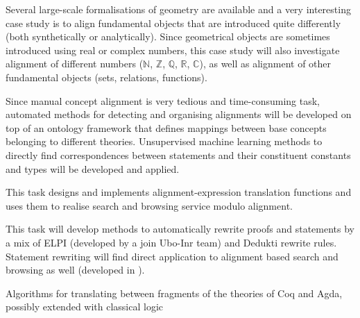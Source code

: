 \begin{workpackage}
\begin{tasklist}
  \begin{task}[id=aligncasestudies,title=Case study: geometry,shorttitle=Cases,lead=Str,StrRM=25,BelRM=20,wphases=6-42!1]
    Several large-scale formalisations of geometry are available and a
    very interesting case study is to align fundamental objects that
    are introduced quite differently (both synthetically or
    analytically). Since geometrical objects are sometimes introduced
    using real or complex numbers, this case study will also
    investigate alignment of different numbers ($\mathbb{N}$,
    $\mathbb{Z}$, $\mathbb{Q}$, $\mathbb{R}$, $\mathbb{C}$), as well
    as alignment of other fundamental objects (sets, relations,
    functions).
  \end{task}

  \begin{task}[id=aligntheories,title=Automated proof engineering,shorttitle=Autom.,lead=Imt,ImtRM=11,InnRM=8,SacRM=9,wphases=6-24!1]
    Since manual concept alignment is very tedious and time-consuming
    task, automated methods for detecting and organising alignments
    will be developed on top of an ontology framework that defines
    mappings between base concepts belonging to different
    theories. Unsupervised machine learning methods to directly find
    correspondences between statements and their constituent constants
    and types will be developed and applied.
  \end{task}

  \begin{task}[id=alignsearch,title=Alignment-Based Search,shorttitle=Search,lead=Fau,FauRM=11,wphases=5-48!.33]
    This task designs and implements alignment-expression translation
    functions and uses them to realise search and browsing service
    modulo alignment.
  \end{task}
  
  \begin{task}[id=alignproofs,title=Proof-Rewriting,shorttitle=Rewr.,lead=Bol,BolRM=14,InrRM=5,wphases=36-48!1.6]
    This task will develop methods to automatically rewrite proofs and
    statements by a mix of ELPI (developed by a join Ubo-Inr team) and
    Dedukti rewrite rules. Statement rewriting will find direct
    application to alignment based search and browsing as well
    (developed in ).
  \end{task}
\end{tasklist}

\begin{wpdelivs}
  \begin{wpdeliv}[due=24,id=prooftheoretical,dissem=PU,nature=DEM,lead=Lee,task=alignlogic]{Algorithms for translating between fragments of the theories of Coq and Agda, possibly extended with classical logic}\end{wpdeliv}


\end{wpdelivs}
\end{workpackage}

